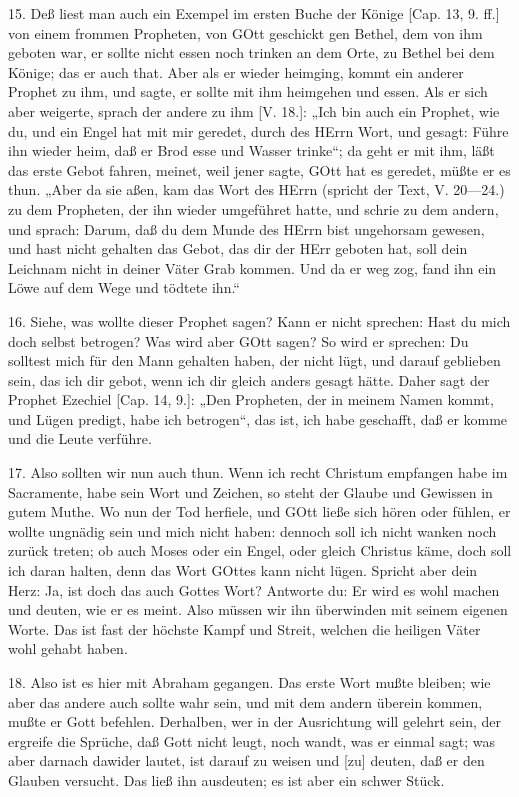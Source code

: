 15. Deß liest man auch ein Exempel im ersten Buche der Könige [Cap. 13, 9. ff.] von einem frommen Propheten, von GOtt geschickt gen Bethel, dem von ihm geboten war, er sollte nicht essen noch trinken an dem Orte, zu Bethel bei dem Könige; das er auch that. Aber als er wieder heimging, kommt ein anderer Prophet zu ihm, und sagte, er sollte mit ihm heimgehen und essen. Als er sich aber weigerte, sprach der andere zu ihm [V. 18.]: „Ich bin auch ein Prophet, wie du, und ein Engel hat mit mir geredet, durch des HErrn Wort, und gesagt: Führe ihn wieder heim, daß er Brod esse und Wasser trinke“; da geht er mit ihm, läßt das erste Gebot fahren, meinet, weil jener sagte, GOtt hat es geredet, müßte er es thun. „Aber da sie aßen, kam das Wort des HErrn (spricht der Text, V. 20—24.) zu dem Propheten, der ihn wieder umgeführet hatte, und schrie zu dem andern, und sprach: Darum, daß du dem Munde des HErrn bist ungehorsam gewesen, und hast nicht gehalten das Gebot, das dir der HErr geboten hat, soll dein Leichnam nicht in deiner Väter Grab kommen. Und da er weg zog, fand ihn ein Löwe auf dem Wege und tödtete ihn.“

16. Siehe, was wollte dieser Prophet sagen? Kann er nicht sprechen: Hast du mich doch selbst betrogen? Was wird aber GOtt sagen? So wird er sprechen: Du solltest mich für den Mann gehalten haben, der nicht lügt, und darauf geblieben sein, das ich dir gebot, wenn ich dir gleich anders gesagt hätte. Daher sagt der Prophet Ezechiel [Cap. 14, 9.]: „Den Propheten, der in meinem Namen kommt, und Lügen predigt, habe ich betrogen“, das ist, ich habe geschafft, daß er komme und die Leute verführe.

17. Also sollten wir nun auch thun. Wenn ich recht Christum empfangen habe im Sacramente, habe sein Wort und Zeichen, so steht der Glaube und Gewissen in gutem Muthe. Wo nun der Tod herfiele, und GOtt ließe sich hören oder fühlen, er wollte ungnädig sein und mich nicht haben: dennoch soll ich nicht wanken noch zurück treten; ob auch Moses oder ein Engel, oder gleich Christus käme, doch soll ich daran halten, denn das Wort GOttes kann nicht lügen. Spricht aber dein Herz: Ja, ist doch das auch
Gottes Wort? Antworte du: Er wird es wohl machen und deuten, wie er es meint. Also müssen wir ihn überwinden mit seinem eigenen Worte. Das ist fast der höchste Kampf und Streit, welchen die heiligen Väter wohl gehabt haben.

18. Also ist es hier mit Abraham gegangen. Das erste Wort mußte bleiben; wie aber das andere auch sollte wahr sein, und mit dem andern überein kommen, mußte er Gott befehlen. Derhalben, wer in der Ausrichtung will gelehrt sein, der ergreife die Sprüche, daß Gott nicht leugt, noch wandt, was er einmal sagt; was aber darnach dawider lautet, ist darauf zu weisen und [zu] deuten, daß er den Glauben versucht. Das ließ ihn ausdeuten; es ist aber ein schwer Stück.


